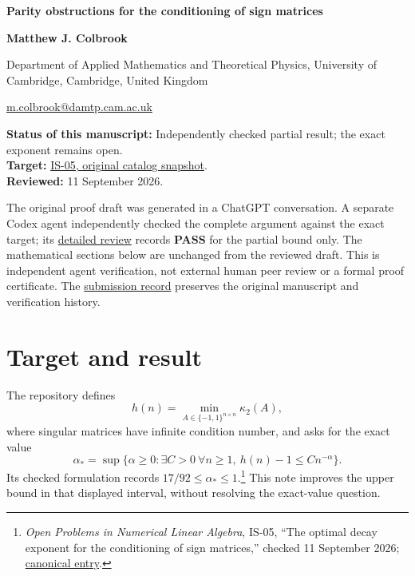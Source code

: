 \documentclass[10pt,a4paper]{article}
\begin{document}
{\raggedright\Large\bfseries Parity obstructions for the conditioning of
sign matrices\par}
\vspace{0.4em}
{\normalsize\bfseries Matthew J. Colbrook\par}
{\small Department of Applied Mathematics and Theoretical Physics,
University of Cambridge, Cambridge, United Kingdom\par}
{\small\href{mailto:m.colbrook@damtp.cam.ac.uk}{m.colbrook@damtp.cam.ac.uk}\par}
\vspace{0.6em}
\textbf{Status of this manuscript:} Independently checked partial
result; the exact exponent remains open.\\
\textbf{Target:}
\href{https://github.com/ajt60gaibb/OpenProblemsInNLA/blob/b4123194697bdf6f8f82518c1dd7d6c40a30c2e0/eigenvalues-and-inverse-problems/IS-05/README.md}{IS-05,
original catalog snapshot}.\\
\textbf{Reviewed:} 11 September 2026.

The original proof draft was generated in a ChatGPT conversation. A
separate Codex agent independently checked the complete argument against
the exact target; its
\href{https://github.com/ajt60gaibb/OpenProblemsInNLA/blob/main/references/colbrook-additional-2026-09-11/verification/reviews/IS-05-review.md}{detailed
review} records \textbf{PASS} for the partial bound only. The
mathematical sections below are unchanged from the reviewed draft. This
is independent agent verification, not external human peer review or a
formal proof certificate. The
\href{https://github.com/ajt60gaibb/OpenProblemsInNLA/blob/main/references/colbrook-additional-2026-09-11/README.md}{submission
record} preserves the original manuscript and verification history.

\section{Target and result}\label{target-and-result}

The repository defines \[
 h(n)=\min_{A\in\{-1,1\}^{n\times n}}\kappa_2(A),
\] where singular matrices have infinite condition number, and asks for
the exact value \[
 \alpha_*=\sup\{\alpha\ge0:\exists C>0\ \forall n\ge1,
            \ h(n)-1\le Cn^{-\alpha}\}.
 \tag{1}
\] Its checked formulation records \(17/92\le\alpha_*\le1\).\footnote{\emph{Open
  Problems in Numerical Linear Algebra}, IS-05, ``The optimal decay
  exponent for the conditioning of sign matrices,'' checked 11 September
  2026;
  \href{https://github.com/ajt60gaibb/OpenProblemsInNLA/blob/main/eigenvalues-and-inverse-problems/IS-05/README.md}{canonical
  entry}.} This note improves the upper bound in that displayed
interval, without resolving the exact-value question.
\end{document}
